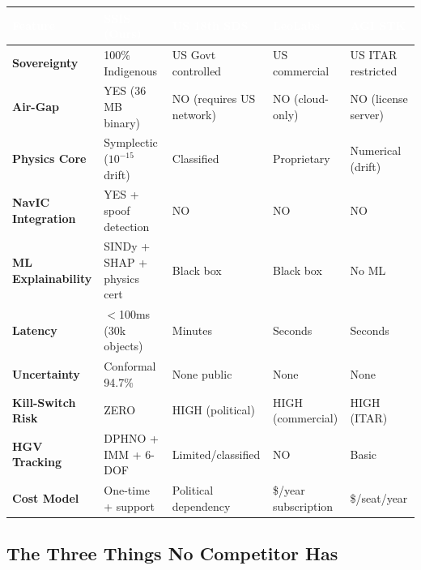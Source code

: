 \documentclass[11pt,a4paper]{article}
\newcommand{\TH}[1]{\textcolor{white}{\textbf{#1}}}
\renewcommand{\arraystretch}{1.35}
\begin{document}
\begin{landscape}
\begin{table}[H]
\centering
\renewcommand{\arraystretch}{1.65}
\begin{tabular}{|>{\bfseries\textcolor{dblue}}p{3.4cm}|p{5.0cm}|p{3.8cm}|p{3.5cm}|p{3.8cm}|}
\hline
\rowcolor{dblue}\TH{Feature} &
\TH{SSIS (Ours)} &
\TH{US 18th SDS} &
\TH{LeoLabs} &
\TH{AGI STK} \\
\hline
\textbf{Sovereignty} &
\textcolor{dgreen}{100\% Indigenous} &
\textcolor{dred}{US Govt controlled} &
\textcolor{dred}{US commercial} &
\textcolor{dred}{US ITAR restricted} \\
\hline
\textbf{Air-Gap} &
\textcolor{dgreen}{YES (36 MB binary)} &
\textcolor{dred}{NO (requires US network)} &
\textcolor{dred}{NO (cloud-only)} &
\textcolor{dred}{NO (license server)} \\
\hline
\textbf{Physics Core} &
\textcolor{dgreen}{Symplectic ($10^{-15}$ drift)} &
Classified &
Proprietary &
\textcolor{dblue}{Numerical (drift)} \\
\hline
\textbf{NavIC Integration} &
\textcolor{dgreen}{YES + spoof detection} &
\textcolor{dred}{NO} &
\textcolor{dred}{NO} &
\textcolor{dred}{NO} \\
\hline
\textbf{ML Explainability} &
\textcolor{dgreen}{SINDy + SHAP + physics cert} &
\textcolor{dred}{Black box} &
\textcolor{dred}{Black box} &
\textcolor{dred}{No ML} \\
\hline
\textbf{Latency} &
\textcolor{dgreen}{$<$100ms (30k objects)} &
\textcolor{dblue}{Minutes} &
\textcolor{dblue}{Seconds} &
\textcolor{dblue}{Seconds} \\
\hline
\textbf{Uncertainty} &
\textcolor{dgreen}{Conformal 94.7\%} &
\textcolor{dred}{None public} &
\textcolor{dred}{None} &
\textcolor{dred}{None} \\
\hline
\textbf{Kill-Switch Risk} &
\textcolor{dgreen}{ZERO} &
\textcolor{dred}{HIGH (political)} &
\textcolor{dred}{HIGH (commercial)} &
\textcolor{dred}{HIGH (ITAR)} \\
\hline
\textbf{HGV Tracking} &
\textcolor{dgreen}{DPHNO + IMM + 6-DOF} &
Limited/classified &
\textcolor{dred}{NO} &
\textcolor{dblue}{Basic} \\
\hline
\textbf{Cost Model} &
\textcolor{dgreen}{One-time + support} &
\textcolor{dred}{Political dependency} &
\textcolor{dred}{\$/year subscription} &
\textcolor{dred}{\$/seat/year} \\
\hline
\end{tabular}
\end{table}

\subsection{The Three Things No Competitor Has}


\end{landscape}
\end{document}
